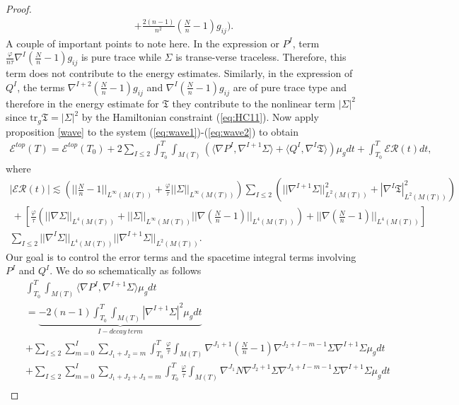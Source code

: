 \documentclass{amsart}
\newcommand{\tr}{\mbox{tr}}
\begin{document}
\begin{proof}
\begin{align}
  + \frac{2(n-1)}{n^{2}}\left(\frac{N}{n}-1\right)g_{ij}
\Bigg).
\end{align}
A couple of important points to note here. In the expression or $P^{I}$, term $\frac{\varphi}{n\tau}\nabla^{I}(\frac{N}{n}-1)g_{ij}$ is pure trace while $\Sigma$ is transe-verse traceless. Therefore, this term does not contribute to the energy estimates. Similarly, in the expression of $Q^{I}$, the terms $\nabla^{I+2}(\frac{N}{n}-1)g_{ij}$ and $\nabla^{I}(\frac{N}{n}-1)g_{ij}$ are of pure trace type and therefore in the energy estimate for $\mathfrak{T}$ they contribute to the nonlinear term $|\Sigma|^{2}$ since $\tr_{g}\mathfrak{T}=|\Sigma|^{2}$ by the Hamiltonian constraint (\ref{eq:HC11}). 
Now apply proposition \ref{wave} to the system (\ref{eq:wave1})-(\ref{eq:wave2}) to obtain 
\begin{align}
\mathscr{E}^{top}(T)= \mathscr{E}^{top}(T_{0})\nonumber+2\sum_{I\leq 2}\int_{T_{0}}^{T}\int_{M(T)}\left(\langle\nabla P^{I},\nabla^{I+1}\Sigma\rangle+\langle Q^{I},\nabla^{I}\mathfrak{T}\rangle\right)\mu_{g}dt+\int_{T_{0}}^{T}\mathscr{ER}(t)dt,  
\end{align}
where  
\begin{align}
 |\mathscr{ER}(t)|\lesssim \left(||\frac{N}{n}-1||_{L^{\infty}(M(T))}\nonumber+\frac{\varphi}{\tau}||\Sigma||_{L^{\infty}(M(T))}\right)\sum_{I\leq 2}(||\nabla^{I+1}\Sigma||^{2}_{L^{2}(M(T))}+|\nabla^{I}\mathfrak{T}|^{2}_{L^{2}(M(T))})\\\
\nonumber+[\frac{\varphi}{\tau}(||\nabla\Sigma||_{L^{4}(M(T))}+||\Sigma||_{L^{\infty}(M(T))}||\nabla(\frac{N}{n}-1)||_{L^{4}(M(T))})+||\nabla(\frac{N}{n}-1)||_{L^{4}(M(T))}]\\\nonumber\sum_{I\leq 2}||\nabla^{I}\Sigma||_{L^{4}(M(T))}||\nabla^{I+1}\Sigma||_{L^{2}(M(T))}.   
\end{align}
Our goal is to control the error terms and the spacetime integral terms involving $P^{I}$ and $Q^{I}$. We do so schematically as follows 
\begin{align}
 &&\int_{T_{0}}^{T}\int_{M(T)}\langle\nabla P^{I},\nabla^{I+1}\Sigma\rangle\mu_{g}dt\\\nonumber 
 &&= 
 \underbrace{-2(n-1)\int_{T_{0}}^{T}\int_{M(T)}|\nabla^{I+1}\Sigma|^{2}\mu_{g}dt}_{I-decay~term}\\\nonumber
 &&+\sum_{I\leq 2}\sum_{m=0}^{I}\sum_{J_{1}+J_{2}=m}\int_{T_{0}}^{T}\frac{\varphi}{\tau}\int_{M(T)}\nonumber \nabla^{J_{1}+1}(\frac{N}{n}-1)\nabla^{J_{2}+I-m-1}\Sigma\nabla^{I+1}\Sigma\mu_{g}dt\\\nonumber&&+\sum_{I\leq 2}\sum_{m=0}^{I}\sum_{J_{1}+J_{2}+J_{3}=m}\int_{T_{0}}^{T}\frac{\varphi}{\tau}\int_{M(T)}\nabla^{J_{1}}N\nabla^{J_{2}+1}\Sigma\nabla^{J_{3}+I-m-1}\Sigma\nabla^{I+1}\Sigma\mu_{g}dt\\\nonumber 

\end{align}
\end{proof}
\end{document}
